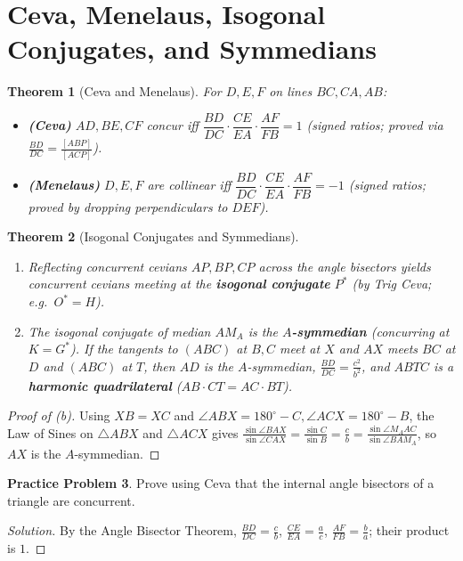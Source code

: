 \documentclass[11pt]{article}
\theoremstyle{plain}
\newtheorem{theorem}{Theorem}[section]
\theoremstyle{definition}
\newtheorem{problem}[theorem]{Practice Problem}
\newenvironment{solution}{\begin{proof}[Solution]}{\end{proof}}
\begin{document}
\section{Ceva, Menelaus, Isogonal Conjugates, and Symmedians}

\begin{theorem}[Ceva and Menelaus]
For $D, E, F$ on lines $BC, CA, AB$:
\begin{itemize}
\item \textbf{(Ceva)} $AD, BE, CF$ concur iff $\dfrac{BD}{DC}\cdot\dfrac{CE}{EA}\cdot\dfrac{AF}{FB} = 1$ (signed ratios; proved via $\frac{BD}{DC} = \frac{[ABP]}{[ACP]}$).
\item \textbf{(Menelaus)} $D, E, F$ are collinear iff $\dfrac{BD}{DC}\cdot\dfrac{CE}{EA}\cdot\dfrac{AF}{FB} = -1$ (signed ratios; proved by dropping perpendiculars to $DEF$).
\end{itemize}
\end{theorem}

\begin{theorem}[Isogonal Conjugates and Symmedians]
\leavevmode
\begin{enumerate}[label=(\alph*)]
\item Reflecting concurrent cevians $AP, BP, CP$ across the angle bisectors yields concurrent cevians meeting at the \textbf{isogonal conjugate} $P^*$ (by Trig Ceva; e.g.\ $O^* = H$).
\item The isogonal conjugate of median $AM_A$ is the \textbf{$A$-symmedian} (concurring at $K = G^*$). If the tangents to $(ABC)$ at $B, C$ meet at $X$ and $AX$ meets $BC$ at $D$ and $(ABC)$ at $T$, then $AD$ is the $A$-symmedian, $\frac{BD}{DC} = \frac{c^2}{b^2}$, and $ABTC$ is a \textbf{harmonic quadrilateral} ($AB \cdot CT = AC \cdot BT$).
\end{enumerate}
\end{theorem}
\begin{proof}[Proof of (b)]
Using $XB=XC$ and $\angle ABX = 180^\circ - C, \angle ACX = 180^\circ - B$, the Law of Sines on $\triangle ABX$ and $\triangle ACX$ gives $\frac{\sin\angle BAX}{\sin\angle CAX} = \frac{\sin C}{\sin B} = \frac{c}{b} = \frac{\sin\angle M_AAC}{\sin\angle BAM_A}$, so $AX$ is the $A$-symmedian.
\end{proof}

\begin{problem}
Prove using Ceva that the internal angle bisectors of a triangle are concurrent.
\end{problem}
\begin{solution}
By the Angle Bisector Theorem, $\frac{BD}{DC} = \frac{c}{b}$, $\frac{CE}{EA} = \frac{a}{c}$, $\frac{AF}{FB} = \frac{b}{a}$; their product is $1$.
\end{solution}
\end{document}
